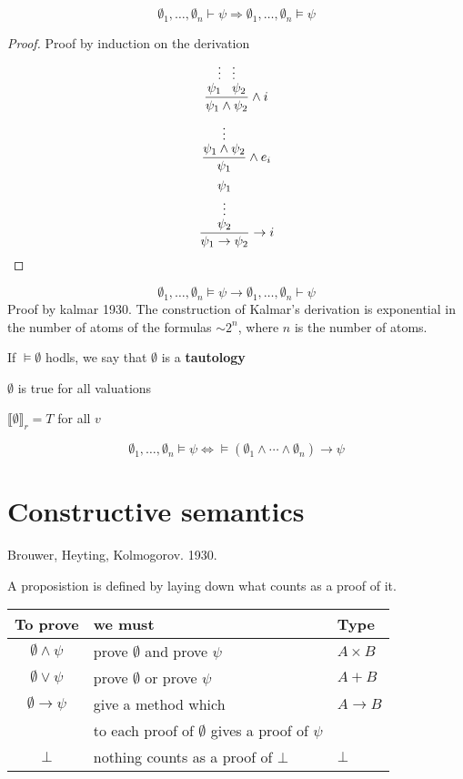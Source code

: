 \documentclass[12pt]{report}
\begin{document}
\begin{setn}[Soundness (1.35)]

\[ \emptyset_1, \dotsc, \emptyset_n \vdash \psi \Rightarrow \emptyset_1,
  \dotsc, \emptyset_n \models \psi\]
\end{setn}
\begin{proof}
Proof by induction on the derivation
\[ \f{\shortstack{\(\vdots \;\;\; \vdots\) \\ \(\psi_1 \;\;\;  \psi_2\)}}{\psi_1 \wedge \psi_2} \wedge i \]
\[\f{\shortstack{\(\vdots\) \\ \(\psi_1 \wedge  \psi_2\)}}{\psi_1} \wedge e_i\]
\[\f{\shortstack{\(\psi_1\)\\ \(\vdots\)\\ \(\psi_2\)}}{\psi_1 \to \psi_2} \to i\]
\end{proof}

\begin{setn}[1.4.4 p 49. Completeness]

\[\emptyset_1, \dotsc, \emptyset_n \models \psi \to \emptyset_1, \dotsc,
  \emptyset_n \vdash \psi\]
Proof by kalmar 1930.
The construction of Kalmar's derivation is exponential in the number of 
atoms of the formulas $\sim 2^n$, where $n$ is the number of atoms.
\end{setn}

\begin{skgr}
  If $\models \emptyset$ hodls, we say that $\emptyset$ is a \textbf{tautology}
\end{skgr}
$\emptyset$ is true for all valuations

$\llbracket \emptyset \rrbracket_r = T$ for all $v$

\[\emptyset_1, \dotsc, \emptyset_n \models \psi \Leftrightarrow \models
  (\emptyset_1 \wedge \dotsb \wedge \emptyset_n) \to \psi \]

\section{Constructive semantics}

Brouwer, Heyting, Kolmogorov. 1930.

A proposistion is defined by laying down what counts as a proof of it.

\begin{tabular*}{1.0\linewidth}{c | l | l}
  To prove& we must& Type\\
  \hline
  \(\emptyset \wedge \psi\) & prove \(\emptyset\) and prove \(\psi\) & \(A \times B\)\\
  \hline
  \(\emptyset \vee \psi\) & prove \(\emptyset\) or prove \(\psi\) & \(A + B\)\\
  \hline
  \(\emptyset \to \psi\) &  give a method which & \(A \to B\)\\
  & to each proof of \(\emptyset\) gives a proof of \(\psi\)  & \\
  \hline
  \(\bot\) & nothing counts as a proof of $\bot$ & \(\bot\) \\
\end{tabular*}
\end{document}
